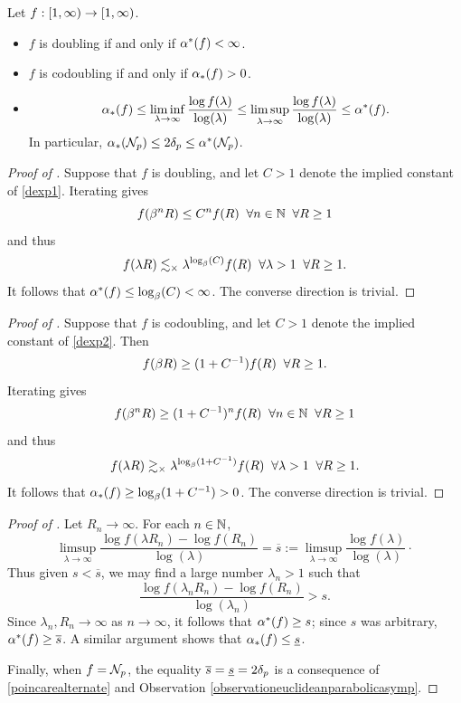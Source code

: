 \begin{lemma}
\label{lemmadexp}
Let $f:[1,\infty)\to[1,\infty)$.
\begin{itemize}
\item[(i)] $f$ is doubling if and only if $\alpha^*(f) < \infty$.
\item[(ii)] $f$ is codoubling if and only if $\alpha_*(f) > 0$.
\item[(iii)]
\[
\alpha_*(f) \leq \liminf_{\lambda\to\infty} \frac{\log f(\lambda)}{\log(\lambda)} \leq \limsup_{\lambda\to\infty} \frac{\log f(\lambda)}{\log(\lambda)} \leq \alpha^*(f).
\]
In particular, $\alpha_*(\mathcal N_p) \leq 2\delta_p \leq \alpha^*(\mathcal N_p)$.
\end{itemize}
\end{lemma}
\begin{proof}[Proof of ]
Suppose that $f$ is doubling, and let $C > 1$ denote the implied constant of \eqref{dexp1}. Iterating gives
\[
f(\beta^n R) \leq C^n f(R) \all n\in\N \all R\geq 1
\]
and thus
\[
f(\lambda R) \lesssim_\times \lambda^{\log_\beta(C)} f(R) \;\;\forall \lambda > 1 \;\;\forall R\geq 1.
\]
It follows that $\alpha^*(f) \leq \log_\beta(C) < \infty$. The converse direction is trivial.
\end{proof}
\begin{proof}[Proof of ]
Suppose that $f$ is codoubling, and let $C > 1$ denote the implied constant of \eqref{dexp2}. Then
\[
f(\beta R) \geq (1 + C^{-1}) f(R) \;\;\forall R\geq 1.
\]
Iterating gives
\[
f(\beta^n R) \geq (1 + C^{-1})^n f(R) \all n\in\N \all R\geq 1
\]
and thus
\[
f(\lambda R) \gtrsim_\times \lambda^{\log_\beta(1 + C^{-1})} f(R) \;\;\forall \lambda > 1 \;\;\forall R\geq 1.
\]
It follows that $\alpha_*(f) \geq \log_\beta(1 + C^{-1}) > 0$. The converse direction is trivial.
\end{proof}
\begin{proof}[Proof of ]
Let $R_n\to\infty$. For each $n\in\N$,
\[
\limsup_{\lambda\to\infty} \frac{\log f(\lambda R_n) - \log f(R_n)}{\log(\lambda)} = \overline s := \limsup_{\lambda\to\infty} \frac{\log f(\lambda)}{\log(\lambda)}\cdot
\]
Thus given $s < \overline s$, we may find a large number $\lambda_n > 1$ such that 
\[
\frac{\log f(\lambda_n R_n) - \log f(R_n)}{\log(\lambda_n)}  > s.
\] 
Since $\lambda_n,R_n\to\infty$ as $n\to\infty$, it follows that $\alpha^*(f) \geq s$; since $s$ was arbitrary, $\alpha^*(f) \geq \overline s$. A similar argument shows that $\alpha_*(f) \leq \underline s$.

Finally, when $f = \mathcal N_p$, the equality $\overline s = \underline s = 2\delta_p$ is a consequence of \eqref{poincarealternate} and Observation \ref{observationeuclideanparabolicasymp}.
\end{proof}

